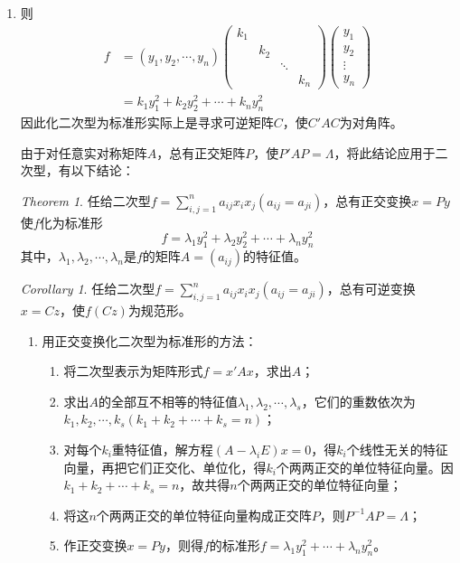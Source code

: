 \documentclass[UTF8]{ctexart}
\theoremstyle{remark}
\newtheorem{theorem}{Theorem}
\newtheorem{corollary}{Corollary}
\begin{document}
\begin{enumerate}
	 \item 
	则
	\[
	\begin{aligned}
		f&=(y_1,y_2,\cdots,y_n)\begin{pmatrix}
			k_1&\\
			&k_2\\
			&&\ddots\\
			&&&k_n
		\end{pmatrix}\begin{pmatrix}
			y_1\\
			y_2\\
			\vdots\\
			y_n
		\end{pmatrix}\\
		&=k_1y_1^2+k_2y_2^2+\cdots+k_ny_n^2
	\end{aligned}
	\]
	因此化二次型为标准形实际上是寻求可逆矩阵$C$，使$C'AC$为对角阵。
	
	由于对任意实对称矩阵$A$，总有正交矩阵$P$，使$P'AP=\Lambda$，将此结论应用于二次型，有以下结论：
	
	\begin{theorem}
		任给二次型$f=\sum_{i,j=1}^na_{ij}x_ix_j(a_{ij}=a_{ji})$，总有正交变换$x=Py$使$f$化为标准形
		\[
		f=\lambda_1y_1^2+\lambda_2y_2^2+\cdots+\lambda_ny_n^2
		\]
		其中，$\lambda_1,\lambda_2,\cdots,\lambda_n$是$f$的矩阵$A=(a_{ij})$的特征值。
	\end{theorem}
	
	\begin{corollary}
		任给二次型$f=\sum_{i,j=1}^na_{ij}x_ix_j(a_{ij}=a_{ji})$，总有可逆变换$x=Cz$，使$f(Cz)$为规范形。
	\end{corollary}
	
	\begin{enumerate}
		\item 用正交变换化二次型为标准形的方法：
		\begin{enumerate}
			\item 将二次型表示为矩阵形式$f=x'Ax$，求出$A$；
			\item 求出$A$的全部互不相等的特征值$\lambda_1,\lambda_2,\cdots,\lambda_s$，它们的重数依次为$k_1,k_2,\cdots,k_s(k_1+k_2+\cdots+k_s=n)$；
			\item 对每个$k_i$重特征值，解方程$(A-\lambda_iE)x=0$，得$k_i$个线性无关的特征向量，再把它们正交化、单位化，得$k_i$个两两正交的单位特征向量。因$k_1+k_2+\cdots+k_s=n$，故共得$n$个两两正交的单位特征向量；
			\item 将这$n$个两两正交的单位特征向量构成正交阵$P$，则$P^{-1}AP=\Lambda$；
			\item 作正交变换$x=Py$，则得$f$的标准形$f=\lambda_1y_1^2+\cdots+\lambda_ny_n^2$。
		\end{enumerate}
		

\end{enumerate}
\end{enumerate}
\end{document}
